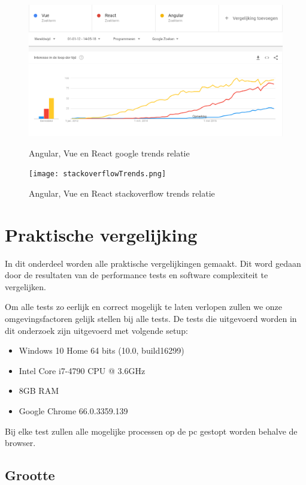 \begin{figure}[h]
	\caption{Angular, Vue en React google trends relatie}
	\centering
	\includegraphics[width=1\textwidth]{img/googleTrends.png}
	\label{fig:google_trends}
\end{figure}

\begin{figure}[h]
	\caption{Angular, Vue en React stackoverflow trends relatie}
	\centering
	\texttt{[image: stackoverflowTrends.png]}
	\label{fig:stackoverflow_trends}
\end{figure}


\section{Praktische vergelijking}
\label{sec:praktische_vergelijking}
In dit onderdeel worden alle praktische vergelijkingen gemaakt. Dit word gedaan door de resultaten van de performance tests en software complexiteit te vergelijken.

Om alle tests zo eerlijk en correct mogelijk te laten verlopen zullen we onze omgevingsfactoren gelijk stellen bij alle tests. De tests die uitgevoerd worden in dit onderzoek zijn uitgevoerd met volgende setup:

\begin{itemize}
	\item Windows 10 Home 64 bits (10.0, build16299)
	\item Intel Core i7-4790 CPU @ 3.6GHz
	\item 8GB RAM
	\item Google Chrome 66.0.3359.139
\end{itemize}

Bij elke test zullen alle mogelijke processen op de pc gestopt worden behalve de browser.

\subsection{Grootte}
\label{sec:grootte}

